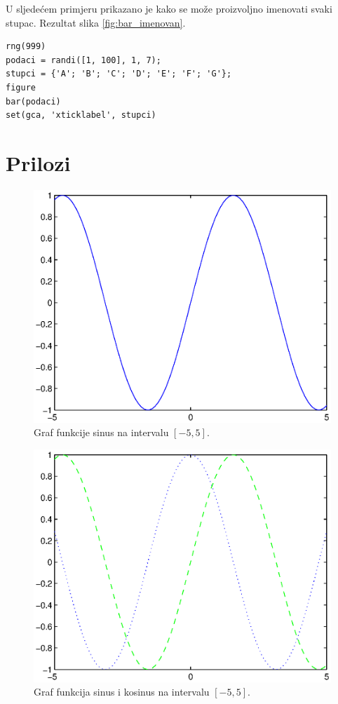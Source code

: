 \documentclass[a4paper, 10pt]{article}
\begin{document}
U sljedećem primjeru prikazano je kako se može proizvoljno imenovati svaki stupac. Rezultat slika \ref{fig:bar_imenovan}.

\begin{lstlisting}
rng(999)
podaci = randi([1, 100], 1, 7);
stupci = {'A'; 'B'; 'C'; 'D'; 'E'; 'F'; 'G'};
figure
bar(podaci)
set(gca, 'xticklabel', stupci)
\end{lstlisting}

\clearpage

\section*{Prilozi}
\label{sec:prilozi}

\begin{figure}[!htb]
\centering
\includegraphics[width=0.95\linewidth]{slike/plot_sin_1.eps}
\caption{Graf funkcije sinus na intervalu $[-5, 5]$.}
\label{fig:plot_sin_1}
\end{figure}

\begin{figure}[!htb]
\centering
\includegraphics[width=0.95\linewidth]{slike/plot_sin_cos_1.eps}
\caption{Graf funkcija sinus i kosinus na intervalu $[-5, 5]$.}
\label{fig:plot_sin_cos_1}
\end{figure}
\end{document}
